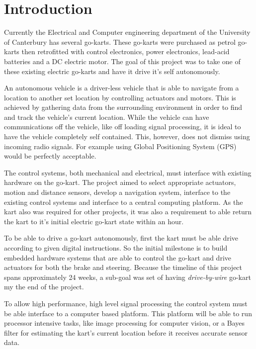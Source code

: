 \section{Introduction}
  Currently the Electrical and Computer engineering department of the
  University of Canterbury has several go-karts. These go-karts were purchased
  as petrol go-karts then retrofitted with control electronics, power
  electronics, lead-acid batteries and a DC electric motor. The goal of this
  project was to take one of these existing electric go-karts and have it drive
  it's self autonomously. 

  An autonomous vehicle is a driver-less vehicle that is able to navigate from
  a location to another set location by controlling actuators and motors. This
  is achieved by gathering data from the surrounding environment in order to
  find and track the vehicle's current location. While the vehicle can have
  communications off the vehicle, like off loading signal processing, it is
  ideal to have the vehicle completely self contained. This, however, does not
  dismiss using incoming radio signals. For example using Global Positioning
  System (GPS) would be perfectly acceptable.

  The control systems, both mechanical and electrical, must interface with
  existing hardware on the go-kart. The project aimed to select appropriate
  actuators, motion and distance sensors, develop a navigation system,
  interface to the existing control systems and interface to a central
  computing platform.  As the kart also was required for other projects, it was
  also a requirement to able return the kart to it's initial electric go-kart
  state within an hour.

  To be able to drive a go-kart autonomously, first the kart must be able drive
  according to given digital instructions. So the initial milestone is to build
  embedded hardware systems that are able to control the go-kart and drive
  actuators for both the brake and steering. Because the timeline of this
  project spans approximately 24 weeks, a sub-goal was set of having
  \emph{drive-by-wire} go-kart my the end of the project.

  To allow high performance, high level signal processing the control system
  must be able interface to a computer based platform. This platform will be
  able to run processor intensive tasks, like image processing for computer
  vision\cite{openCV}, or a Bayes filter for estimating the kart's current
  location before it receives accurate sensor data.

